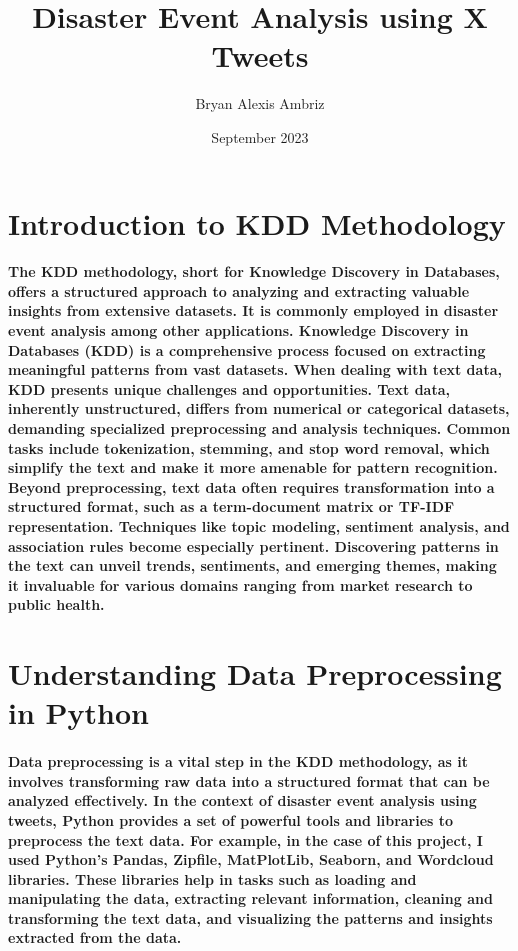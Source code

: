 \documentclass{article}
\title{Disaster Event Analysis using X Tweets}
\author{Bryan Alexis Ambriz}
\date{September 2023}
\begin{document}
\maketitle
\section{Introduction to KDD Methodology}
\paragraph{The KDD methodology, short for Knowledge Discovery in Databases, offers a structured approach to analyzing and extracting valuable insights from extensive datasets. It is commonly employed in disaster event analysis among other applications. Knowledge Discovery in Databases (KDD) is a comprehensive process focused on extracting meaningful patterns from vast datasets. When dealing with text data, KDD presents unique challenges and opportunities. Text data, inherently unstructured, differs from numerical or categorical datasets, demanding specialized preprocessing and analysis techniques. Common tasks include tokenization, stemming, and stop word removal, which simplify the text and make it more amenable for pattern recognition. Beyond preprocessing, text data often requires transformation into a structured format, such as a term-document matrix or TF-IDF representation. Techniques like topic modeling, sentiment analysis, and association rules become especially pertinent. Discovering patterns in the text can unveil trends, sentiments, and emerging themes, making it invaluable for various domains ranging from market research to public health.}
\section{Understanding Data Preprocessing in Python}
\paragraph{Data preprocessing is a vital step in the KDD methodology, as it involves transforming raw data into a structured format that can be analyzed effectively. In the context of disaster event analysis using tweets, Python provides a set of powerful tools and libraries to preprocess the text data. For example, in the case of this project, I used Python's Pandas, Zipfile, MatPlotLib, Seaborn, and Wordcloud libraries. These libraries help in tasks such as loading and manipulating the data, extracting relevant information, cleaning and transforming the text data, and visualizing the patterns and insights extracted from the data.}
\end{document}
